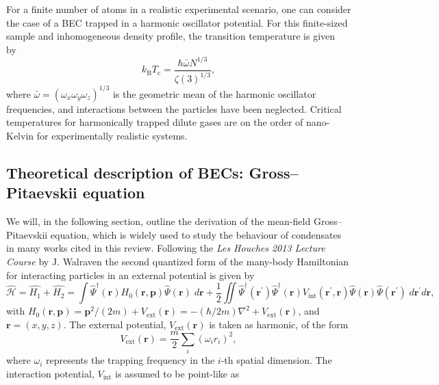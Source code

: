 For a finite number of atoms in a realistic experimental scenario, one can consider the case of a BEC trapped in a harmonic oscillator potential. For this finite-sized sample and inhomogeneous density profile, the transition temperature is given by~\cite{BK:Pitaevskii_Stringari_2003}
\begin{equation}
k_{\textrm{B}}T_{\textrm{c}} = \frac{\hbar\bar{\omega}N^{1/3}}{\zeta(3)^{1/3}},
\end{equation}
where $\bar{\omega}=(\omega_x\omega_y\omega_z)^{1/3}$ is the geometric mean of the harmonic oscillator frequencies, and interactions between the particles have been neglected. Critical temperatures for harmonically trapped dilute gases are on the order of nano-Kelvin for experimentally realistic systems.

\subsection{Theoretical description of BECs: Gross--Pitaevskii equation}\label{sub:gpederiv}
We will, in the following section, outline the derivation of the mean-field Gross--Pitaevskii equation, which is widely used to study the behaviour of condensates in many works cited in this review. Following the \textit{Les Houches 2013 Lecture Course} by J. Walraven \cite{LEC:Walraven_lh_2013} the second quantized form of the many-body Hamiltonian for interacting particles in an external potential is given by
\begin{equation}\label{eqn:ham2ndq}
\hat{\mathcal{H}} = \hat{H_1} + \hat{H_2} = \int \hat{\Psi}^{\dagger}(\mathbf{r}) H_0\left(\textbf{r},\textbf{p} \right)  \hat{\Psi}(\mathbf{r}) \; d\textbf{r}  + \frac{1}{2} \iint\hat{\Psi}^{\dagger}(\mathbf{r}^\prime)\hat{\Psi}^{\dagger}(\mathbf{r})V_{\textrm{int}}(\textbf{r}^\prime,\textbf{r})\hat{\Psi}(\mathbf{r})\hat{\Psi}(\mathbf{r}^\prime) \; d\textbf{r}^\prime d\textbf{r},
\end{equation}
with $H_0\left(\mathbf{r}, \mathbf{p} \right) = \mathbf{p}^2/({2m}) + V_{\textrm{ext}}\left(\mathbf{r}\right) = -({\hbar/2m})\nabla^2 + V_{\textrm{ext}}\left(\mathbf{r}\right)$, and $\mathbf{r} = (x,y,z)$. The external potential, $V_{\text{ext}}(\mathbf{r})$ is taken as harmonic, of the form
\begin{equation}
V_{\text{ext}}(\mathbf{r}) = \frac{m}{2}\displaystyle\sum_{i}{\left(\omega_i r_i \right)^2},\end{equation}
where $\omega_i$ represents the trapping frequency in the $i$-th spatial dimension. The interaction potential, $V_{\text{int}}$ is assumed to be point-like as

